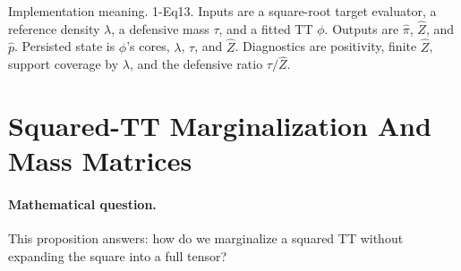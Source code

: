 \documentclass[11pt]{article}
\numberwithin{equation}{section}
\begin{document}
\begin{center}
\end{center}

Implementation meaning. 1-Eq13.  Inputs are a square-root target
evaluator, a reference density \(\lambda\), a defensive mass \(\tau\), and a
fitted TT \(\phi\).  Outputs are \(\widehat\pi\), \(\widehat Z\), and
\(\widehat p\).  Persisted state is \(\phi\)'s cores, \(\lambda\), \(\tau\),
and \(\widehat Z\).  Diagnostics are positivity, finite \(\widehat Z\), support
coverage by \(\lambda\), and the defensive ratio \(\tau/\widehat Z\).

\section{Squared-TT Marginalization And Mass Matrices}

\paragraph{Mathematical question.}
This proposition answers: how do we marginalize a squared TT without expanding
the square into a full tensor?
\end{document}
